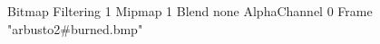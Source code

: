 {Bitmap
	{Filtering 1}
	{Mipmap 1}
	{Blend none}
	{AlphaChannel 0}
	{Frame "arbusto2#burned.bmp"}
}
